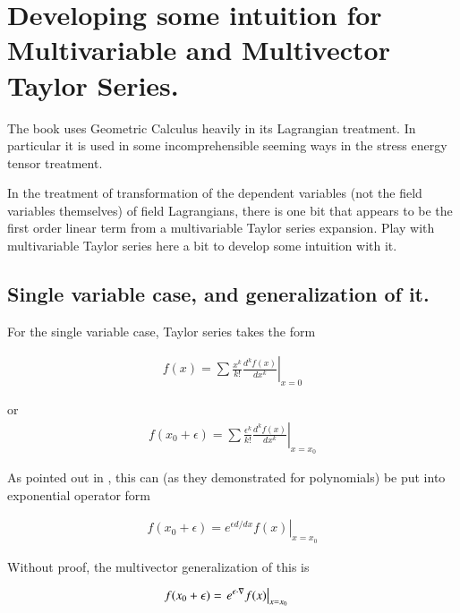 \chapter{Developing some intuition for Multivariable and Multivector Taylor Series.}\label{chap:PJmultiTaylors}
\date{ April 28, 2009.  $RCSfile: multivectorTaylors.tex,v $ Last $Revision: 1.12 $ $Date: 2009/06/11 16:45:58 $ }

The book \cite{doran2003gap} uses Geometric Calculus heavily in its 
Lagrangian treatment.  In particular it is used in some incomprehensible seeming ways in the 
stress energy tensor treatment.

In the treatment of transformation of the dependent variables (not the field
variables themselves) of field Lagrangians, there is one bit that
appears to be the first order linear term from a multivariable Taylor
series expansion.  Play with multivariable Taylor series here a bit
to develop some intuition with it.

\section{Single variable case, and generalization of it. }

For the single variable case, Taylor series takes the form

\begin{align}
f(x) = \sum \frac{x^k}{k!} \left. \frac{d^k f(x)}{dx^k} \right\vert_{x=0}
\end{align}

or
\begin{align}
f(x_0 + \epsilon) = \sum \frac{\epsilon^k}{k!} \left. \frac{d^k f(x)}{dx^k} \right\vert_{x=x_0}
\end{align}

As pointed out in \cite{byron1992mca}, this can (as they demonstrated for polynomials) be put into exponential 
operator form

\begin{align}
f(x_0 + \epsilon) = \left. e^{\epsilon d/dx} f(x) \right\vert_{x=x_0}
\end{align}

Without proof, the multivector generalization of this is

\begin{align}\label{eqn:multivector_taylors:taylorsExponential}
f(x_0 + \epsilon) 
&= \left. e^{\epsilon \cdot \nabla} f(x) \right\vert_{x=x_0} 
\end{align}

